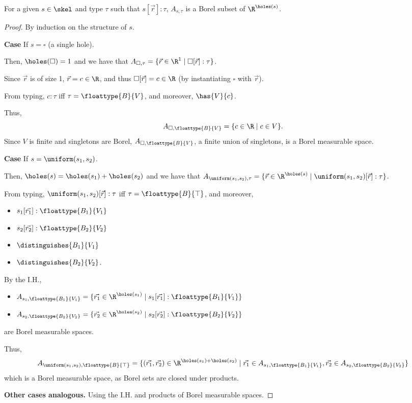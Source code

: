 \begin{lemma}
	For a given $s \in \skel$ and type $\tau$ such that $s[\vec{r}] : \tau$, $A_{s,\tau}$ is a Borel subset of $\R^{\holes(s)}$.
\end{lemma}

\begin{proof}
	By induction on the structure of $s$.

	\textbf{Case} If $s = \square$ (a single hole). 
	
	Then, $\holes(\square) = 1$ and we have that $A _{\square, \tau} = \{\vec{r} \in \R^1 \mid \square[\vec{r}] : \tau\}$. 

	Since $\vec{r}$ is of size 1, $\vec{r} = c \in \R$, and thus $\square[\vec{r}] = c \in \R$ (by instantiating $\square$ with $\vec{r}$).

	From typing, $c : \tau$ iff $\tau = \floattype{B}{V}$, and moreover, $\has{V}{c}$.

	Thus, 
	\[
		A_{\square, \floattype{B}{V}} = \{c \in \R \mid c \in V\}.
	\]
	Since $V$ is finite and singletons are Borel, $A_{\square, \floattype{B}{V}}$, a finite union of singletons, is a Borel measurable space.

	\textbf{Case} If $s = \uniform(s_1, s_2)$. 

	Then, $\holes(s) = \holes(s_1) + \holes(s_2)$ and we have that $A_{\uniform(s_1,s_2), \tau} = \{\vec{r} \in \R^{\holes(s)} \mid \uniform(s_1,s_2)[\vec{r}] : \tau\}$.

	From typing, $\uniform(s_1,s_2)[\vec{r}] : \tau$ iff $\tau = \floattype{B}{\top}$, and moreover, 
	\begin{itemize}
		\item $s_1[\vec{r_1}] : \floattype{B_1}{V_1}$
		\item $s_2[\vec{r_2}] : \floattype{B_2}{V_2}$
		\item $\distinguishes{B_1}{V_1}$
		\item $\distinguishes{B_2}{V_2}$.
	\end{itemize}

	By the I.H., 
	\begin{itemize}
		\item $A_{s_1,\floattype{B_1}{V_1}} = \{\vec{r_1} \in \R^{\holes(s_1)} \mid s_1[\vec{r_1}] : \floattype{B_1}{V_1}\}$
		\item $A_{s_2,\floattype{B_2}{V_2}} = \{\vec{r_2} \in \R^{\holes(s_2)} \mid s_2[\vec{r_2}] : \floattype{B_2}{V_2}\}$
	\end{itemize}
	are Borel measurable spaces.

	Thus,
	\[
		A_{\uniform(s_1,s_2), \floattype{B}{\top}} = \{(\vec{r_1}, \vec{r_2}) \in \R^{\holes(s_1) + \holes(s_2)} \mid \vec{r_1} \in A_{s_1, \floattype{B_1}{V_1}}, \vec{r_2} \in A_{s_2, \floattype{B_2}{V_2}}\}
	\]
	which is a Borel measurable space, as Borel sets are closed under products.

	\textbf{Other cases analogous.} Using the I.H. and products of Borel measurable spaces.
\end{proof}

